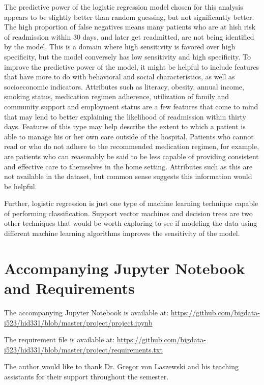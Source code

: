 \documentclass[sigconf]{acmart}
\begin{document}
The predictive power of the logistic regression model chosen for this analysis appears to be slightly better than random guessing, but not significantly better. The high proportion of false negatives means many patients who are at hish risk of readmission within 30 days, and later get readmitted, are not being identified by the model. This is a domain where high sensitivity is favored over high specificity, but the model conversely has low sensitivity and high specificity. To improve the predictive power of the model, it might be helpful to include features that have more to do with behavioral and social characteristics, as well as socioeconomic indicators. Attributes such as literacy, obesity, annual income, smoking status, medication regimen adherence, utilization of family and community support and employment status are a few features that come to mind that may lend to better explaining the likelihood of readmission within thirty days. Features of this type may help describe the extent to which a patient is able to manage his or her own care outside of the hospital. Patients who cannot read or who do not adhere to the recommended medication regimen, for example, are patients who can reasonably be said to be less capable of providing consistent and effective care to themselves in the home setting. Attributes such as this are not available in the dataset, but common sense suggests this information would be helpful.

Further, logistic regression is just one type of machine learning technique capable of performing classification. Support vector machines and decision trees are two other techniques that would be worth exploring to see if modeling the data using different machine learning algorithms improves the sensitivity of the model.

\appendix

\section{Accompanying Jupyter Notebook and Requirements}
The accompanying Jupyter Notebook is available at: \url{https://github.com/bigdata-i523/hid331/blob/master/project/project.ipynb}

The requirement file is available at: \url{https://github.com/bigdata-i523/hid331/blob/master/project/requirements.txt}

\begin{acks}

The author would like to thank Dr. Gregor von Laszewski and his teaching assistants for their support throughout the semester.

\end{acks}
\end{document}
